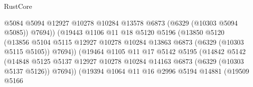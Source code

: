 \begin{lexlean}{RustCore}
\begin{coremodule}
                                        @5084
                                        @5094
                                        @12927
                                        @10278
                                        @10284
                                        @13578
                                        @6873
                                        (@6329 (@10303 @5094 @5085))
                                        @7694))
                                    (@19443
                                      @1106
                                      @11
                                      @18
                                      @5120
                                      @5196
                                      (@13850
                                        @5120
                                        (@13856
                                          @5104
                                          @5115
                                          @12927
                                          @10278
                                          @10284
                                          @13863
                                          @6873
                                          (@6329 (@10303 @5115 @5105))
                                          @7694))
                                      (@19464
                                        @1105
                                        @11
                                        @17
                                        @5142
                                        @5195
                                        (@14842
                                          @5142
                                          (@14848
                                            @5125
                                            @5137
                                            @12927
                                            @10278
                                            @10284
                                            @14163
                                            @6873
                                            (@6329 (@10303 @5137 @5126))
                                            @7694))
                                        (@19394
                                          @1064
                                          @11
                                          @16
                                          @2996
                                          @5194
                                          @14881
                                          (@19509
                                            @5166

\end{coremodule}
\end{lexlean}
